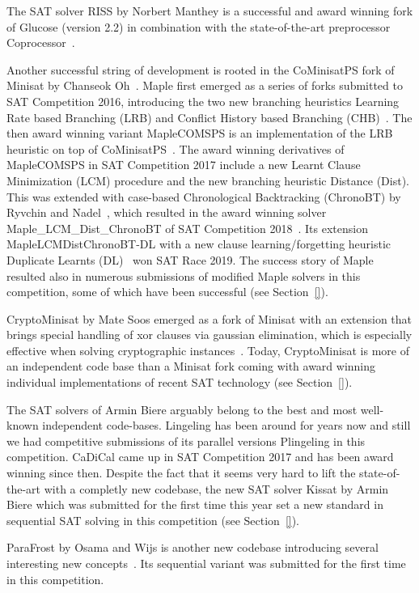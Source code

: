 \documentclass{elsarticle}
\begin{document}
The SAT solver RISS by Norbert Manthey is a successful and award winning fork of Glucose (version 2.2) in combination with the state-of-the-art preprocessor Coprocessor~\cite{}. 

Another successful string of development is rooted in the CoMinisatPS fork of Minisat by Chanseok Oh~\cite{}. 
Maple first emerged as a series of forks submitted to SAT Competition 2016, introducing the two new branching heuristics Learning Rate based Branching (LRB) and Conflict History based Branching (CHB)~\cite{}. 
The then award winning variant MapleCOMSPS is an implementation of the LRB heuristic on top of CoMinisatPS~\cite{}. 
The award winning derivatives of MapleCOMSPS in SAT Competition 2017 include a new Learnt Clause Minimization (LCM) procedure and the new branching heuristic Distance (Dist). 
This was extended with case-based Chronological Backtracking (ChronoBT) by Ryvchin and Nadel~\cite{}, which resulted in the award winning solver Maple\_LCM\_Dist\_ChronoBT of SAT Competition 2018~\cite{}. 
Its extension MapleLCMDistChronoBT-DL with a new clause learning/forgetting heuristic Duplicate Learnts (DL)~\cite{} won SAT Race 2019. 
The success story of Maple resulted also in numerous submissions of modified Maple solvers in this competition, some of which have been successful (see Section~\ref{}). 

CryptoMinisat by Mate Soos emerged as a fork of Minisat with an extension that brings special handling of xor clauses via gaussian elimination, which is especially effective when solving cryptographic instances~\cite{}. 
Today, CryptoMinisat is more of an independent code base than a Minisat fork coming with award winning individual implementations of recent SAT technology (see Section~\ref{}). 

The SAT solvers of Armin Biere arguably belong to the best and most well-known independent code-bases. 
Lingeling has been around for years now and still we had competitive submissions of its parallel versions Plingeling in this competition. 
CaDiCal came up in SAT Competition 2017 and has been award winning since then. 
Despite the fact that it seems very hard to lift the state-of-the-art with a completly new codebase, the new SAT solver Kissat by Armin Biere which was submitted for the first time this year set a new standard in sequential SAT solving in this competition (see Section~\ref{}). 

ParaFrost by Osama and Wijs is another new codebase introducing several interesting new concepts~\cite{}. 
Its sequential variant was submitted for the first time in this competition. 
\end{document}
